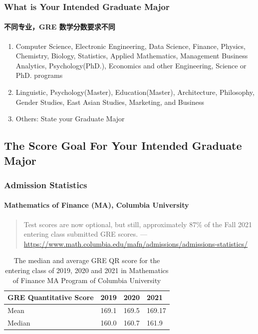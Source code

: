 \documentclass[
	11pt, %
]{beamer}
\begin{document}
\begin{frame}
	\frametitle{What is Your Intended Graduate Major}
	\framesubtitle{不同专业，GRE 数学分数要求不同} %
	
	\begin{enumerate}
		\item Computer Science, Electronic Engineering, Data Science, Finance,
Physics, Chemistry, Biology, Statistics, Applied Mathematics,
Management Business Analytics, Psychology(PhD.), Economics and
other Engineering, Science or PhD. programs
		\item Linguistic, Psychology(Master), Education(Master), Architecture,
Philosophy, Gender Studies, East Asian Studies, Marketing, and
Business
\item Others: State your Graduate Major
	\end{enumerate}
\end{frame}


\subsection{The Score Goal For Your Intended Graduate Major}


\begin{frame}
	\frametitle{Admission Statistics}
	\framesubtitle{Mathematics of Finance (MA), Columbia University}
	\begin{quote}
	Test scores are now optional, but still, approximately \alert{87\%} of the Fall 2021 entering class submitted GRE scores.
	---\url{https://www.math.columbia.edu/mafn/admissions/admissions-statistics/}
	\end{quote}
	\bigskip %
	\begin{table}
		\begin{tabular}{l l l l}
			\toprule
			\textbf{GRE Quantitative Score} & \textbf{2019} & \textbf{2020} & \textbf{2021}\\
			\midrule
			Mean & 169.1 & 169.5 & 169.17 \\
			Median & 160.0 & 160.7 & 161.9 \\
			\bottomrule
		\end{tabular}
		\caption{The median and average GRE QR score for the entering class of 2019, 2020 and 2021 in Mathematics of Finance MA Program of Columbia University}
	\end{table}
\end{frame}
\end{document}
